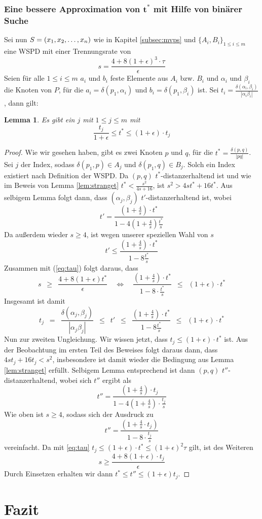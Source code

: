 \documentclass[11pt]{article}
\newtheorem{lemma}[theorem]{Lemma}
\begin{document}
	\subsubsection*{Eine bessere Approximation von $\mathbf{t^*}$ mit Hilfe von binärer Suche}
	Sei nun $S = (x_1, x_2, \mathellipsis, x_n)$ wie in Kapitel \ref{subsec:mvps} und $\{A_i, B_i\}_{1 \leq i \leq m}$ eine WSPD mit einer Trennungsrate von 
	\[
	s = \frac{4 + 8(1 + \epsilon)^3 \cdot \tau}{\epsilon}
	\]
	Seien für alle $1 \leq i \leq m$ $a_i$ und $b_i$ feste Elemente aus $A_i$ bzw. $B_i$ und $\alpha_i$ und $\beta_i$ die Knoten von $P$, für die $a_i = \delta(p_1, \alpha_i)$ und $b_i = \delta(p_1, \beta_i)$ ist. 
	Sei $t_i = \frac{\delta(\alpha_i, \beta_i)}{|\alpha_i \beta_i|}$, dann gilt:
	\begin{lemma}
		\label{lem:tstartj}
		Es gibt ein $j$ mit $1 \leq j \leq m$ mit
		\[
			\frac{t_j}{1 + \epsilon} \leq t^* \leq (1 + \epsilon) \cdot t_j
		\]
	\end{lemma}
	\begin{proof}
		Wie wir gesehen haben, gibt es zwei Knoten $p$ und $q$, für die $t^* = \frac{\delta(p, q)}{|pq|}$. Sei $j$ der Index, sodass $\delta(p_1, p) \in A_j$ und $\delta(p_1, q) \in B_j$. Solch ein Index existiert nach Definition der WSPD. Da $(p, q)$ $t^*$-distanzerhaltend ist und wie im Beweis von Lemma \ref{lem:stranget} $t^* < \frac{s^2}{4s + 16}$, ist $s^2 > 4st^* + 16t^*$. 
		Aus selbigem Lemma folgt dann, dass $(\alpha_j, \beta_j)$ $t'$-distanzerhaltend ist, wobei
		\[
		t' = \frac{(1 + \frac{4}{s}) \cdot t^*}{1 - 4(1 + \frac{4}{s})\frac{t^*}{s}}
		\]
		Da außerdem wieder $s \geq 4$, ist wegen unserer speziellen Wahl von $s$
		\[
		t' \leq \frac{(1 + \frac{4}{s}) \cdot t^*}{1 - 8\frac{t^*}{s}}
		\]
		Zusammen mit (\ref{eq:tau}) folgt daraus, dass 
		\[
		s 
		\enspace\geq\enspace \frac{4 + 8(1 + \epsilon)t^*}{\epsilon} 
		\quad \Leftrightarrow \quad
		\frac{(1 + \frac{4}{s})\cdot t^*}{1 - 8 \cdot \frac{t^*}{s}} 
		\enspace\leq\enspace (1 + \epsilon)\cdot t^*
		\]
		Insgesamt ist damit
		\[
		t_j 
		\enspace = \enspace \frac{\delta(\alpha_j, \beta_j)}{|\alpha_j \beta_j|} 
		\enspace\leq\enspace t' 
		\enspace\leq\enspace \frac{(1 + \frac{4}{s}) \cdot t^*}{1 - 8\frac{t^*}{s}}
		\enspace\leq\enspace (1 + \epsilon)\cdot t^*
		\]
		Nun zur zweiten Ungleichung. 
		Wir wissen jetzt, dass $t_j \leq (1 + \epsilon) \cdot t^*$ ist.
		Aus der Beobachtung im ersten Teil des Beweises folgt daraus dann, dass $4st_j + 16t_j < s^2$, insbesondere ist damit wieder die Bedingung aus Lemma \ref{lem:stranget} erfüllt.
		Selbigem Lemma entsprechend ist dann $(p, q)$ $t''$-distanzerhaltend, wobei sich $t''$ ergibt als
		\[
		t'' = \frac{(1 + \frac{4}{s})\cdot t_j}{1 - 4 (1 + \frac{4}{s}) \cdot \frac{t_j}{s}}
		\]
		Wie oben ist $s \geq 4$, sodass sich der Ausdruck zu 
		\[
		t'' = \frac{(1 + \frac{4}{s}\cdot t_j)}{1 - 8 \cdot \frac{t_j}{s}}
		\]
		vereinfacht.
		Da mit \ref{eq:tau} $t_j \leq (1 + \epsilon) \cdot t^* \leq (1 + \epsilon)^2 \tau$ gilt, ist des Weiteren
		\[
		s \geq \frac{4 + 8 (1 + \epsilon) \cdot t_j}{\epsilon}
		\]
		Durch Einsetzen erhalten wir dann $t^* \leq t'' \leq (1 + \epsilon) t_j$.
	\end{proof}
	
	\section{Fazit}
    \label{sec:fazit}

    
    
\end{document}
